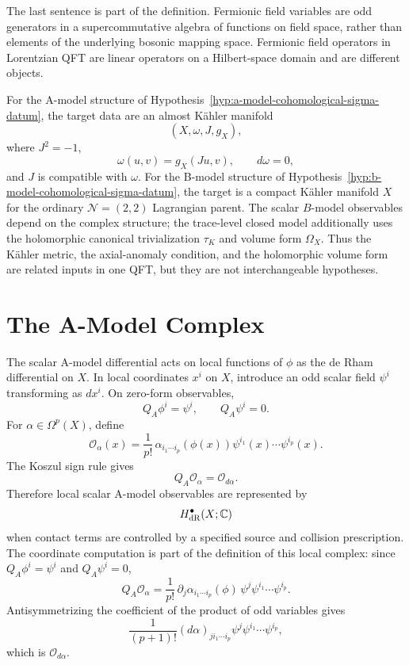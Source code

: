 The last sentence is part of the definition.  Fermionic field variables are
odd generators in a supercommutative algebra of functions on field space,
rather than elements of the underlying bosonic mapping space.  Fermionic field
operators in Lorentzian QFT are linear operators on a Hilbert-space domain and
are different objects.

For the A-model structure of
Hypothesis~\ref{hyp:a-model-cohomological-sigma-datum}, the target data are an
almost K\"ahler manifold
\[
  (X,\omega,J,g_X),
\]
where \(J^2=-1\),
\[
  \omega(u,v)=g_X(Ju,v),
  \qquad
  d\omega=0,
\]
and \(J\) is compatible with \(\omega\).  For the B-model structure of
Hypothesis~\ref{hyp:b-model-cohomological-sigma-datum}, the target is a
compact K\"ahler manifold \(X\) for the ordinary \(\mathcal N=(2,2)\)
Lagrangian parent.  The scalar \(B\)-model observables depend on the complex
structure; the trace-level closed model additionally uses the holomorphic
canonical trivialization \(\tau_K\) and volume form \(\Omega_X\).  Thus the
K\"ahler metric, the axial-anomaly condition, and the holomorphic volume form
are related inputs in one QFT, but they are not interchangeable hypotheses.

\section{The A-Model Complex}

The scalar A-model differential acts on local functions of \(\phi\) as the de
Rham differential on \(X\).  In local coordinates \(x^i\) on \(X\), introduce
an odd scalar field \(\psi^i\) transforming as \(d x^i\).  On zero-form
observables,
\[
  Q_A \phi^i=\psi^i,
  \qquad
  Q_A\psi^i=0 .
\]
For \(\alpha\in\Omega^p(X)\), define
\[
  \mathcal O_\alpha(x)
  =
  \frac{1}{p!}\,
  \alpha_{i_1\cdots i_p}(\phi(x))
  \psi^{i_1}(x)\cdots\psi^{i_p}(x).
\]
The Koszul sign rule gives
\[
  Q_A\mathcal O_\alpha=\mathcal O_{d\alpha}.
\]
Therefore local scalar A-model observables are represented by
\[
  H^\bullet_{\rm dR}(X;\mathbb C)
\]
when contact terms are controlled by a specified source and collision
prescription.
The coordinate computation is part of the definition of this local complex:
since \(Q_A\phi^i=\psi^i\) and \(Q_A\psi^i=0\),
\[
  Q_A\mathcal O_\alpha
  =
  \frac{1}{p!}\,
  \partial_j\alpha_{i_1\cdots i_p}(\phi)\,
  \psi^j\psi^{i_1}\cdots\psi^{i_p}.
\]
Antisymmetrizing the coefficient of the product of odd variables gives
\[
  \frac{1}{(p+1)!}(d\alpha)_{j i_1\cdots i_p}
  \psi^j\psi^{i_1}\cdots\psi^{i_p},
\]
which is \(\mathcal O_{d\alpha}\).

